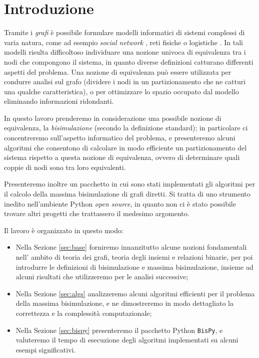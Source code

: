 \section*{Introduzione}

Tramite i \emph{grafi} è possibile formulare modelli informatici di sistemi complessi di varia natura, come ad esempio \emph{social network} \cite{twitter}, reti fisiche \cite{electric} o logistiche \cite{supply}. In tali modelli risulta difficoltoso individuare una nozione univoca di equivalenza tra i nodi che compongono il sistema, in quanto diverse definizioni catturano differenti aspetti del problema. Una nozione di equivalenza può essere utilizzata per condurre analisi sul grafo (dividere i nodi in un partizionamento che ne catturi una qualche caratteristica), o per ottimizzare lo spazio occupato dal modello eliminando informazioni ridondanti.

In questo lavoro prenderemo in considerazione una possibile nozione di equivalenza, la \emph{bisimulazione} (secondo la definizione standard); in particolare ci concentreremo sull'aspetto informatico del problema, e presenteremo alcuni algoritmi che consentono di calcolare in modo efficiente un partizionamento del sistema rispetto a questa nozione di equivalenza, ovvero di determinare quali coppie di nodi sono tra loro equivalenti.

Presenteremo inoltre un pacchetto in cui sono stati implementati gli algoritmi per il calcolo della massima bisimulazione di grafi diretti. Si tratta di uno strumento inedito nell'ambiente Python \emph{open source}, in quanto non ci è stato possibile trovare altri progetti che trattassero il medesimo argomento.

Il lavoro è organizzato in questo modo:
\begin{itemize}
    \item Nella Sezione \ref{sec:base} forniremo innanzitutto alcune nozioni fondamentali nell' ambito di teoria dei grafi, teoria degli insiemi e relazioni binarie, per poi introdurre le definizioni di bisimulazione e massima bisimulazione, insieme ad alcuni risultati che utilizzeremo per le analisi successive;
    \item Nella Sezione \ref{sec:algs} analizzeremo alcuni algoritmi efficienti per il problema della massima bisimulazione, e ne dimostreremo in modo dettagliato la correttezza e la complessità computazionale;
    \item Nella Sezione \ref{sec:bispy} presenteremo il pacchetto Python \texttt{BisPy}, e valuteremo il tempo di esecuzione degli algoritmi implementati su alcuni esempi significativi.
\end{itemize}
